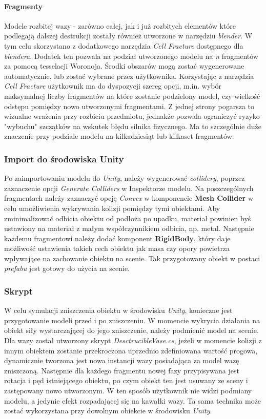 \paragraph{Fragmenty}
Modele rozbitej wazy - zarówno całej, jak i już rozbitych elementów które podlegają dalszej destrukcji zostały również utworzone w narzędziu \textit{blender}.
W tym celu skorzystano z dodatkowego narzędzia \textit{Cell Fracture} dostępnego dla \textit{blendera}. Dodatek ten pozwala na podział utworzonego modelu na  \textit{n} fragmentów za pomocą tesselacji Woronoja. Środki obszarów mogą zostać wygenerowane automatycznie, lub zostać wybrane przez użytkownika. Korzystając z narzędzia \textit{Cell Fracture} użytkownik ma do dyspozycji szereg opcji, m.in. wybór maksymalnej liczby fragmentów na które zostanie podzielony model, czy wielkość odstępu pomiędzy nowo utworzonymi fragmentami. Z jednej strony pogarsza to wizualne wrażenia przy rozbiciu przedmiotu, jednakże pozwala ograniczyć ryzyko "wybuchu" szczątków na wskutek błędu silnika fizycznego. Ma to szczególnie duże znaczenie przy podziale modelu na kilkadziesiąt lub kilkaset fragmentów.

\subsubsection{Import do środowiska Unity}
Po zaimportowaniu modelu do \textit{Unity}, należy wygenerować \textit{collidery}, poprzez zaznaczenie opcji \textit{Generate Colliders} w Inspektorze modelu. Na poszczególnych fragmentach należy zaznaczyć opcję \textit{Convex} w komponencie \textbf{Mesh Collider} w celu umożliwienia wykrywania kolizji pomiędzy tymi obiektami. Aby zminimalizować odbicia obiektu od podłoża po upadku, materiał powinien byś ustawiony na materiał z małym współczynnikiem odbicia, np. metal. Następnie każdemu fragmentowi należy dodać komponent \textbf{RigidBody}, który daje możliwość ustawienia takich cech obiektu jak masa czy opory powietrza wpływające na zachowanie obiektu na scenie. Tak przygotowany obiekt w postaci \textit{prefabu} jest gotowy do użycia na scenie.

\subsubsection{Skrypt}
W celu symulacji zniszczenia obiektu w środowisku \textit{Unity}, konieczne jest przygotowanie modeli przed i po zniszczeniu. W momencie wykrycia działania na obiekt siły wystarczającej do jego zniszczenie, należy podmienić model na scenie. \\
Dla wazy został utworzony skrypt \textit{DesctrucibleVase.cs}, jeżeli w momencie kolizji z innym obiektem zostanie przekroczona uprzednio zdefiniowana wartość progowa, dynamicznie tworzona jest nowa instancji wazy posiadająca za model wazę zniszczoną. Następnie dla każdego fragmentu nowej fazy przypisywana jest rotacja i pęd istniejącego obiektu, po czym obiekt ten jest usuwany ze sceny i zastępowany nowo utworzonym. W ten sposób użytkownik nie widzi podmiany modelu, a jedynie efekt rozpadającej się na kawałki wazy. Ta sama technika może zostać wykorzystana przy dowolnym obiekcie w środowisku \textit{Unity}.

